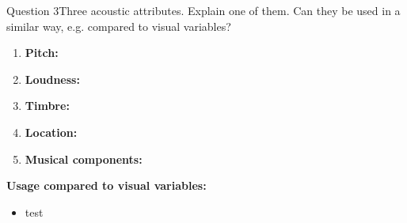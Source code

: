 \documentclass[t,aspectratio=169,divpsnames]{beamer}
\begin{document}
\begin{frame}{Question 3}{Three acoustic attributes. Explain one of them. Can they be used in a similar way, e.g. compared to visual variables?}
\scriptsize
\begin{enumerate}
    \item \textbf{Pitch:}
    \item \textbf{Loudness:}
    \item \textbf{Timbre:}
    \item \textbf{Location:}
    \item \textbf{Musical components:}
\end{enumerate}
\textbf{Usage compared to visual variables:}
\scriptsize
\begin{itemize}
    \item test
\end{itemize}
\end{frame}
\end{document}
